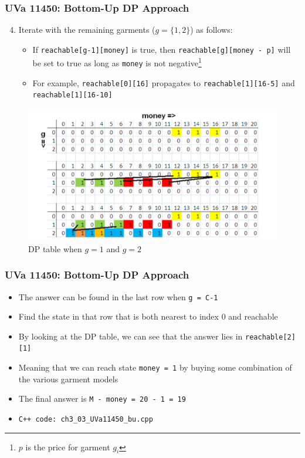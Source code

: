 \documentclass{beamer}
\begin{document}
\begin{frame}[fragile]
\frametitle{UVa 11450: Bottom-Up DP Approach}

\begin{enumerate}
	\setcounter{enumi}{3}
    \item Iterate with the remaining garments ($g=\{1,2\}$) as follows:
    	\begin{itemize}
		    \item If \verb|reachable[g-1][money]| is true, then \verb|reachable[g][money - p]| will be set to true as long as \verb|money| is not negative\footnote{$p$ is the price for garment $g_i$}
		    \item For example, \verb|reachable[0][16]| propagates to \verb|reachable[1][16-5]| and \verb|reachable[1][16-10]|
		\end{itemize}
\end{enumerate}

\begin{figure}
    \centering
    \includegraphics[scale=0.4]{imgs/11450_2.png}
    \caption{DP table when $g=1$ and $g=2$}
\end{figure}

\end{frame}

\begin{frame}[fragile]
\frametitle{UVa 11450: Bottom-Up DP Approach}

\begin{itemize}
    \item The answer can be found in the last row when \verb|g = C-1|
    \item Find the state in that row that is both nearest to index $0$ and reachable
    \item By looking at the DP table, we can see that the answer lies in \verb|reachable[2][1]|
    \item Meaning that we can reach state \verb|money = 1| by buying some combination of the various garment models
    \item \color{blue}The final answer is \verb|M - money = 20 - 1 = 19|\color{black}
    \item \color{red}\verb|C++ code: ch3_03_UVa11450_bu.cpp|\color{black}
\end{itemize}

\end{frame}
\end{document}
